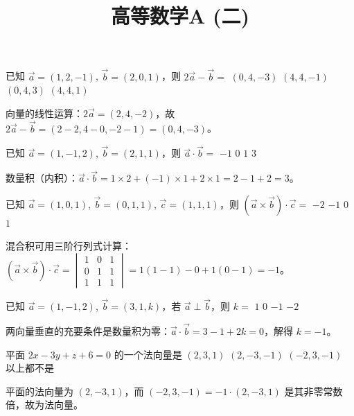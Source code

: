 \documentclass[answer]{THUExam}
\title{高等数学A (二)}
\author{}
\begin{document}
\vspace{1cm}
\makehead

\vspace{1cm}


\begin{problem}
已知 $\vec{a}=(1,2,-1)$, $\vec{b}=(2,0,1)$，则 $2\vec{a}-\vec{b}=$
\options
{$(0,4,-3)$}
{$(4,4,-1)$}
{$(0,4,3)$}
{$(4,4,1)$}
\end{problem}
\begin{note}
向量的线性运算：$2\vec{a}=(2,4,-2)$，故 $2\vec{a}-\vec{b}=(2-2,4-0,-2-1)=(0,4,-3)$。
\end{note}
\bigskip

\begin{problem}
已知 $\vec{a}=(1,-1,2)$, $\vec{b}=(2,1,1)$，则 $\vec{a}\cdot\vec{b}=$
\options
{$-1$}
{$0$}
{$1$}
{$3$}
\end{problem}
\begin{note}
数量积（内积）：$\vec{a}\cdot\vec{b}=1\times2+(-1)\times1+2\times1=2-1+2=3$。
\end{note}
\bigskip

\begin{problem}
已知 $\vec{a}=(1,0,1)$, $\vec{b}=(0,1,1)$, $\vec{c}=(1,1,1)$，则 $(\vec{a}\times\vec{b})\cdot\vec{c}=$
\options
{$-2$}
{$-1$}
{$0$}
{$1$}
\end{problem}
\begin{note}
混合积可用三阶行列式计算：$(\vec{a}\times\vec{b})\cdot\vec{c}=\begin{vmatrix}1&0&1\\0&1&1\\1&1&1\end{vmatrix}=1(1-1)-0+1(0-1)=-1$。
\end{note}
\bigskip

\begin{problem}
已知 $\vec{a}=(1,-1,2)$, $\vec{b}=(3,1,k)$，若 $\vec{a}\perp\vec{b}$，则 $k=$
\options
{$1$}
{$0$}
{$-1$}
{$-2$}
\end{problem}
\begin{note}
两向量垂直的充要条件是数量积为零：$\vec{a}\cdot\vec{b}=3-1+2k=0$，解得 $k=-1$。
\end{note}
\bigskip

\begin{problem}
平面 $2x-3y+z+6=0$ 的一个法向量是
\options
{$(2,3,1)$}
{$(2,-3,-1)$}
{$(-2,3,-1)$}
{以上都不是}
\end{problem}
\begin{note}
平面的法向量为 $(2,-3,1)$，而 $(-2,3,-1)=-1\cdot(2,-3,1)$ 是其非零常数倍，故为法向量。
\end{note}
\bigskip
\end{document}
